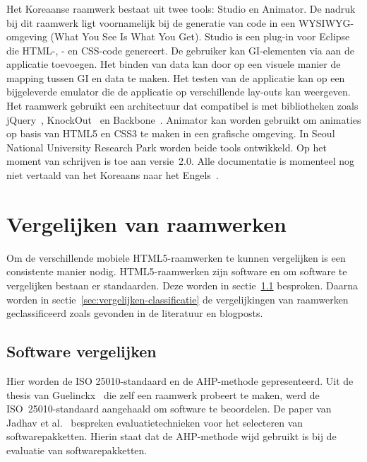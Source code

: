\subsubsection{\davinci}%
Het Koreaanse raamwerk \davinci{} bestaat uit twee tools:  \davinci{} Studio en \davinci{} Animator.
De nadruk bij dit raamwerk ligt voornamelijk bij de generatie van code in een WYSIWYG-omgeving (What You See Is What You Get).
\davinci{} Studio is een plug-in voor Eclipse die HTML-,  \js{}- en CSS-code genereert.
De gebruiker kan GI-elementen via  aan de applicatie toevoegen.
Het binden van data kan door op een visuele manier de mapping tussen GI en data te maken.
Het testen van de applicatie kan op een bijgeleverde emulator die de applicatie op verschillende lay-outs kan weergeven.
Het raamwerk gebruikt een architectuur dat compatibel is met  bibliotheken zoals jQuery~\cite{JQuery2013a}, KnockOut~\cite{KnockOut2013} en Backbone~\cite{Backbone2013}.
\davinci{} Animator kan worden gebruikt om animaties op basis van HTML5 en CSS3 te maken in een grafische omgeving.
In Seoul National University Research Park worden beide tools ontwikkeld.
Op het moment van schrijven is \davinci{} toe aan versie~2.0.  
Alle documentatie is momenteel nog niet vertaald van het Koreaans naar het Engels~\cite{Incross}.

 

\section{Vergelijken van raamwerken} 
\label{sec:vergelijken-raamwerken}
Om de verschillende mobiele HTML5-raamwerken te kunnen vergelijken is een consistente manier nodig.
HTML5-raamwerken zijn software en om software te vergelijken bestaan er standaarden.
Deze worden in sectie~\ref{sec:vergelijken-standaarden} besproken.
Daarna worden in sectie~\ref{sec:vergelijken-classificatie} de vergelijkingen van raamwerken geclassificeerd zoals gevonden in de literatuur en blogposts.

\subsection{Software vergelijken}
\label{sec:vergelijken-standaarden}
Hier worden de ISO 25010-standaard en de AHP-methode gepresenteerd.  
Uit de thesis van Guelinckx~\cite{Guelinckx2012} die zelf een raamwerk probeert te maken, werd de ISO~25010-standaard aangehaald om software te beoordelen.
De paper van Jadhav et al.~\cite{Jadhav2009} bespreken evaluatietechnieken voor het selecteren van softwarepakketten.
Hierin staat dat de AHP-methode wijd gebruikt is bij de evaluatie van softwarepakketten.

